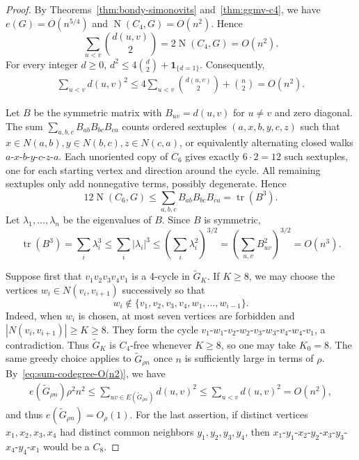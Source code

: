 \documentclass[11pt,letterpaper]{article}
\newcommand{\N}{\operatorname{N}}
\newcommand{\ind}{\mathbf{1}}
\begin{document}
\begin{proof}
  By Theorems~\ref{thm:bondy-simonovits} and~\ref{thm:ggmv-c4}, we have
  \(e(G)=O(n^{5/4})\) and \(\N(C_4,G)=O(n^2)\). Hence
  \[
    \sum_{u<v}\binom{d(u,v)}{2}=2\N(C_4,G)=O(n^2).
  \]
  For every integer \(d\ge0\), $d^2\le4\binom d2+\ind_{\{d=1\}}$.
  Consequently,
  \begin{align}\label{eq:sum-codegree-O(n2)}
      \sum_{u<v}d(u,v)^2
    \le4\sum_{u<v}\binom{d(u,v)}2+\binom n2
    =O(n^2).
  \end{align}



  Let \(B\) be the symmetric matrix with \(B_{uv}=d(u,v)\) for \(u\ne v\) and zero diagonal. The sum
    $\sum_{a,b,c}B_{ab}B_{bc}B_{ca}$ counts ordered sextuples \((a,x,b,y,c,z)\) such that $x\in N(a,b),y\in N(b,c),z\in N(c,a)$, 
  or equivalently alternating closed walks $a$-$x$-$b$-$y$-$c$-$z$-$a$. Each unoriented copy of \(C_6\) gives
  exactly \(6\cdot2=12\) such sextuples, one for each starting vertex and direction around the cycle.
  All remaining sextuples only add nonnegative terms, possibly degenerate. Hence
  \[
    12\N(C_6,G)\le \sum_{a,b,c}B_{ab}B_{bc}B_{ca}=\operatorname{tr}(B^3).
  \]
  Let
  \(\lambda_1,\ldots,\lambda_n\) be the eigenvalues of \(B\). Since \(B\) is symmetric,
  \[
    \operatorname{tr}(B^3)=\sum_i\lambda_i^3
    \le\sum_i|\lambda_i|^3
    \le\left(\sum_i\lambda_i^2\right)^{3/2}
    =\left(\sum_{u,v}B_{uv}^2\right)^{3/2}
    =O(n^3).
  \]

  Suppose first that \(v_1v_2v_3v_4v_1\) is a 4-cycle in \(\tilde{G}_K\). If \(K\ge8\), we may choose
  the vertices \(w_i\in N(v_i,v_{i+1})\) successively so that
  \[
    w_i\notin\{v_1,v_2,v_3,v_4,w_1,\ldots,w_{i-1}\}.
  \]
  Indeed, when \(w_i\) is chosen, at most seven vertices are forbidden and
  \(|N(v_i,v_{i+1})|\ge K\ge8\). They form the cycle
  $v_1$-$w_1$-$v_2$-$w_2$-$v_3$-$w_3$-$v_4$-$w_4$-$v_1$,
  a contradiction. Thus \(\tilde{G}_K\) is \(C_4\)-free whenever \(K\ge8\), so one may take \(K_0=8\).
  The same greedy choice applies to \(\tilde{G}_{\rho n}\) once \(n\) is sufficiently large in terms of \(\rho\).
  By~\eqref{eq:sum-codegree-O(n2)}, we have
  \begin{align*}
    e(\tilde{G}_{\rho n})\rho^2n^2
    \le\sum_{uv\in E(\tilde{G}_{\rho n})}d(u,v)^2
    \le\sum_{u<v}d(u,v)^2
    =O(n^2),
  \end{align*}
  and thus \(e(\tilde{G}_{\rho n})=O_\rho(1)\).
  For the last assertion, if distinct vertices \(x_1,x_2,x_3,x_4\) had distinct common neighbors
  \(y_1,y_2,y_3,y_4\), then $x_1$-$y_1$-$x_2$-$y_2$-$x_3$-$y_3$-$x_4$-$y_4$-$x_1$ would be a \(C_8\).
\end{proof}
\end{document}
